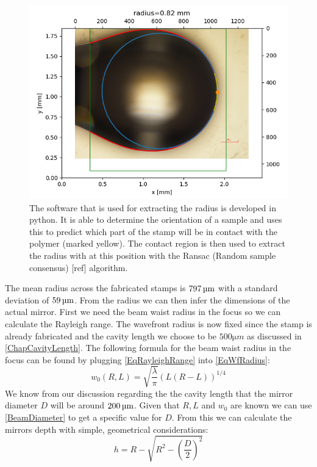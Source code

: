 \begin{figure}[H]
	\includegraphics[scale=0.6]{source/radius_analysis}
	\caption{The software that is used for extracting the radius is developed in python. It is able to determine the orientation of a sample and uses this to predict which part of the stamp will be in contact with the polymer (marked yellow). The contact region is then used to extract the radius with at this position with the Ransac (Random sample consensus) [ref] algorithm.}
\end{figure}
The mean radius across the fabricated stamps is $797\um$ with a standard deviation of $59\um$. From the radius we can then infer the dimensions of the actual mirror. First we need the beam waist radius in the focus so we can calculate the Rayleigh range. The wavefront radius is now fixed since the stamp is already fabricated and the cavity length we choose to be $500\si{\micro m}$ as discussed in \autoref{ChapCavityLength}. The following formula for the beam waist radius in the focus can be found by plugging \autoref{EqRayleighRange} into \autoref{EqWfRadius}:
\begin{equation}
	w_0(R, L)=\sqrt{\frac{\lambda}{\pi}}\left(L(R-L)\right)^{1/4}
\end{equation}
We know from our discussion regarding the the cavity length that the mirror diameter $D$ will be around $200\um$. Given that $R, L$ and $w_0$ are known we can use \autoref{BeamDiameter} to get a specific value for $D$. From this we can calculate the mirrors depth with simple, geometrical considerations:
\begin{equation}
	h=R-\sqrt{R^2-\left(\frac{D}{2}\right)^2}
\end{equation}
